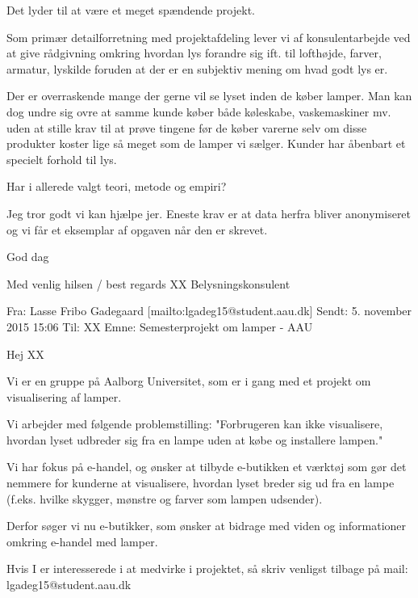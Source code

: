 \documentclass[oneside,a4paper,titlepage]{article}
\begin{document}
Det lyder til at være et meget spændende projekt.
 
Som primær detailforretning med projektafdeling lever vi af konsulentarbejde ved at give rådgivning omkring hvordan lys forandre sig ift. til lofthøjde, farver, armatur, lyskilde foruden at der er en subjektiv mening om hvad godt lys er.

Der er overraskende mange der gerne vil se lyset inden de køber lamper. Man kan dog undre sig ovre at samme kunde køber både køleskabe, vaskemaskiner mv. uden at stille krav til at prøve tingene før de køber varerne selv om disse produkter koster lige så meget som de lamper vi sælger. Kunder har åbenbart et specielt forhold til lys. 

Har i allerede valgt teori, metode og empiri? 

Jeg tror godt vi kan hjælpe jer. Eneste krav er at data herfra bliver anonymiseret og vi får et eksemplar af opgaven når den er skrevet.

God dag

Med venlig hilsen / best regards\newline
XX\newline
Belysningskonsulent

\noindent\makebox[\linewidth]{\rule{\paperwidth}{0.4pt}}

Fra: Lasse Fribo Gadegaard [mailto:lgadeg15@student.aau.dk] \newline
Sendt: 5. november 2015 15:06\newline
Til: XX\newline
Emne: Semesterprojekt om lamper - AAU
 
Hej XX
 
Vi er en gruppe på Aalborg Universitet, som er i gang med et projekt om visualisering af lamper.
 
Vi arbejder med følgende problemstilling:
"Forbrugeren kan ikke visualisere, hvordan lyset udbreder sig fra en lampe uden at købe og installere lampen." 

Vi har fokus på e-handel, og ønsker at tilbyde e-butikken et værktøj som gør det nemmere for kunderne at visualisere, hvordan lyset breder sig ud fra en lampe (f.eks. hvilke skygger, mønstre og farver som lampen udsender). 

Derfor søger vi nu e-butikker, som ønsker at bidrage med viden og informationer omkring e-handel med lamper.  

Hvis I er interesserede i at medvirke i projektet, så skriv venligst tilbage på mail: lgadeg15@student.aau.dk 
\end{document}
